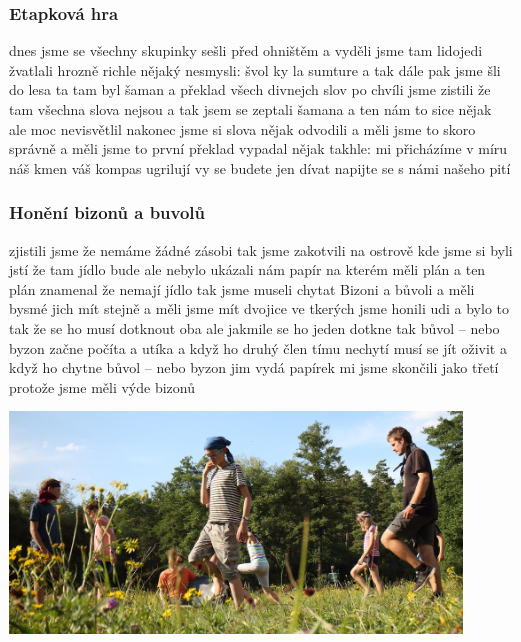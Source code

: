 

\subsubsection{Etapková hra} %
\label{ssub:etapková_hra}
	
dnes jsme se všechny skupinky sešli před ohništěm a vyděli jsme tam lidojedi žvatlali hrozně richle nějaký nesmysli: švol ky la sumture a tak dále pak jsme šli do lesa ta tam byl šaman a překlad všech divnejch slov po chvíli jsme zistili že tam všechna slova nejsou a tak jsem se zeptali šamana a ten nám to sice nějak ale moc nevisvětlil nakonec jsme si slova nějak odvodili a měli jsme to skoro správně a měli jsme to první překlad vypadal nějak takhle: mi přicházíme v míru náš kmen váš kompas ugrilují vy se budete jen dívat napijte se s námi našeho pití


\subsubsection{Honění bizonů a buvolů} %
\label{ssub:honění_bizonů_a_buvolů}

zjistili jsme že nemáme žádné zásobi tak jsme zakotvili na ostrově kde jsme si byli jstí že tam jídlo bude ale nebylo ukázali nám papír na kterém měli plán a ten plán znamenal že nemají jídlo tak jsme museli chytat Bizoni a bůvoli a měli bysmé jich mít stejně a měli jsme mít dvojice ve tkerých jsme honili udi a bylo to tak že se ho musí dotknout oba ale jakmile se ho jeden dotkne tak bůvol – nebo byzon začne počíta a utíka a když ho druhý člen tímu nechytí musí se jít oživit a když ho chytne bůvol – nebo byzon jim vydá papírek mi jsme skončili jako třetí protože jsme měli výde bizonů

\begin{center}
	\includegraphics[width=12cm]{img/anpetu_tabor/hra.jpg}
\end{center}

